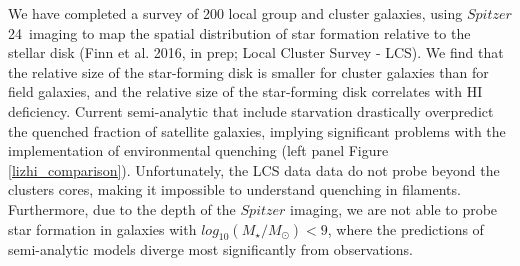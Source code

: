 \documentclass[11pt, preprint]{aastex}
\begin{document}

 

We have completed a survey of 200 local group and cluster galaxies, using
$Spitzer$ 24\micron \ imaging to map the spatial distribution of star
formation relative to the stellar disk (Finn et al. 2016, in prep; Local Cluster Survey - LCS).  We find that the relative
size of the star-forming disk is smaller for cluster galaxies than for
field galaxies, and the relative size of the star-forming disk
correlates with HI deficiency.  
Current semi-analytic that include starvation drastically overpredict the quenched fraction
of satellite galaxies, implying significant problems with the
implementation of environmental quenching (left panel Figure
\ref{lizhi_comparison}).  Unfortunately, the LCS data data do not probe beyond
the clusters cores, making it impossible to understand quenching in filaments.  Furthermore, due to the depth of the $Spitzer$ imaging, we are not able to probe
star formation in galaxies with $log_{10} (M_\star/M_\odot) < 9$, where the predictions of semi-analytic models diverge most
significantly from observations.
\end{document}
